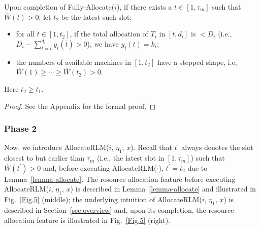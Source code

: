 \documentclass[10pt,journal,compsoc]{IEEEtran}
\begin{document}
\begin{lemma}\label{lemma-allocate}
Upon completion of Fully-Allocate($i$), if there exists a $t\in [1, \tau_{m}]$ such that $\overline{W}(t)>0$, let $t_{2}$ be the latest such slot:
\begin{itemize}
 \setlength\itemsep{0.2em}

  \item for all $t\in[1, t_{2}]$, if the total allocation of $T_{i}$ in $[t, d_{i}]$ is $<D_{i}$ (i.e., $D_{i}-\sum_{\overline{t}=t}^{d_{i}}{y_{i}(\overline{t})}>0$), we have $y_{i}(t)=k_{i}$;

  \item the numbers of available machines in $[1, t_{2}]$ have a stepped shape, i.e, $\overline{W}(1)\geq \cdots \geq \overline{W}(t_{2})>0$.
\end{itemize}
Here $t_{2}\geq t_{1}$.
\end{lemma}
\begin{proof}
See the Appendix for the formal proof.
\end{proof}





\subsubsection{Phase 2}
\label{sec.phase-2}




Now, we introduce AllocateRLM($i$, $\eta_{1}$, $x$). Recall that $t^{\prime}$ always denotes the slot closest to but earlier than $\tau_{m}$ (i.e., the latest slot in $[1, \tau_{m}]$) such that $\overline{W}(t^{\prime})>0$ and, before executing AllocateRLM($\cdot$), $t^{\prime}=t_{2}$ due to Lemma~\ref{lemma-allocate}. The resource allocation feature before executing AllocateRLM($i$, $\eta_{1}$, $x$) is described in Lemma~\ref{lemma-allocate} and illustrated in Fig.~\ref{Fig.5} (middle); the underlying intuition of AllocateRLM($i$, $\eta_{1}$, $x$) is described in Section~\ref{sec.overview} and, upon its completion, the resource allocation feature is illustrated in Fig.~\ref{Fig.5} (right).
\end{document}
